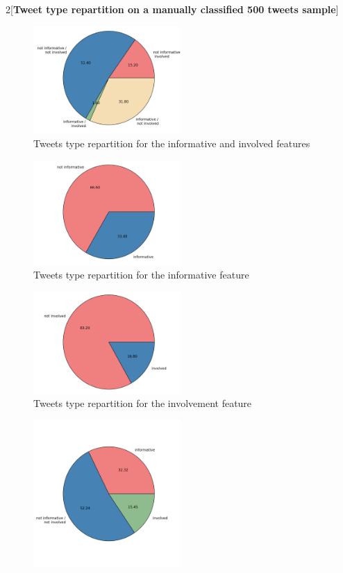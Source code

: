 \documentclass[a4paper,12pt]{report}
\begin{document}
\begin{multicols}{2}[\textbf{Tweet type repartition on a manually classified 500 tweets sample}]

\begin{figure}[H]
\centering
\includegraphics[width=0.5\textwidth]{images/plots/pies/pie_pairs.png}
\caption{Tweets type repartition for the informative and involved features}
\label{pieTypeInfInv}
\end{figure}
\begin{figure}[H]
\centering
\includegraphics[width=0.5\textwidth]{images/plots/pies/pie_info.png}
\caption{Tweets type repartition for the informative feature}
\label{pieTypeInf}
\end{figure}
\begin{figure}[H]
\centering
\includegraphics[width=0.5\textwidth]{images/plots/pies/pie_invo.png}
\caption{Tweets type repartition for the involvement feature}
\label{pieTypeInv}
\end{figure}
\vspace*{-1cm}
\begin{figure}[H]
\centering
\includegraphics[width=0.5\textwidth]{images/plots/pies/pie_pairs3.png}

\end{figure}
\end{multicols}
\end{document}
